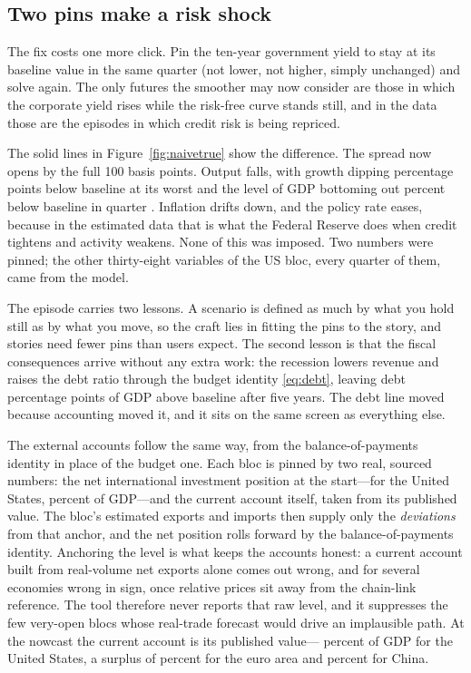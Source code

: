 \documentclass[11pt]{article}
\begin{document}
\subsection{Two pins make a risk shock}\label{sec:truespread}

The fix costs one more click. Pin the ten-year government yield to stay at its baseline value
in the same quarter (not lower, not higher, simply unchanged) and solve again. The only
futures the smoother may now consider are those in which the corporate yield rises while the
risk-free curve stands still, and in the data those are the episodes in which credit risk is
being repriced.

The solid lines in Figure~\ref{fig:naivetrue} show the difference. The spread now opens by
the full 100 basis points. Output falls, with growth dipping \TrueGdpGrowthMinPp{} percentage
points below baseline at its worst and the level of GDP bottoming out \TrueGdpTroughPct{}
percent below baseline in quarter \TrueGdpTroughQ. Inflation drifts down, and the policy rate
eases, because in the estimated data that is what the Federal Reserve does when credit
tightens and activity weakens. None of this was imposed. Two numbers were pinned; the other
thirty-eight variables of the US bloc, every quarter of them, came from the model.

The episode carries two lessons. A scenario is defined as much by what you hold still as by
what you move, so the craft lies in fitting the pins to the story, and stories need fewer
pins than users expect. The second lesson is that the fiscal consequences arrive without
any extra work: the recession lowers revenue
and raises the debt ratio through the budget identity \eqref{eq:debt}, leaving debt
\DebtGapHPp{} percentage points of GDP above baseline after five years. The debt line moved
because accounting moved it, and it sits on the same screen as everything else.

The external accounts follow the same way, from the balance-of-payments identity in place of
the budget one. Each bloc is pinned by two real, sourced numbers: the net international
investment position at the start---for the United States, \ExtUsNfaSeed{} percent of GDP---and
the current account itself, taken from its published value. The bloc's estimated exports and
imports then supply only the \emph{deviations} from that anchor, and the net position rolls
forward by the balance-of-payments identity. Anchoring the level is what keeps the accounts
honest: a current account built from real-volume net exports alone comes out wrong, and for
several economies wrong in sign, once relative prices sit away from the chain-link reference.
The tool therefore never reports that raw level, and it suppresses the few very-open blocs
whose real-trade forecast would drive an implausible path. At the nowcast the current account
is its
published value---\ExtUsCaAnchor{} percent of GDP for the United States, a surplus of
\ExtEaCaAnchor{} percent for the euro area and \ExtCnCaAnchor{} percent for China.
\end{document}
